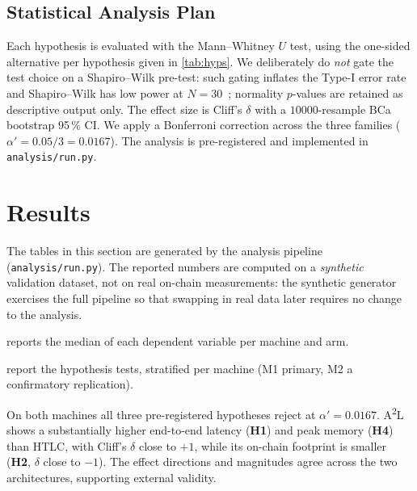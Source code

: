 \documentclass[sigconf,nonacm]{acmart}
\newcommand{\atwol}{A\textsuperscript{2}L\xspace}
\newcommand{\hyplabel}[1]{\textbf{H#1}}
\newcommand{\code}[1]{\texttt{\small #1}}
\begin{document}
\subsection{Statistical Analysis Plan}
Each hypothesis is evaluated with the Mann--Whitney $U$ test, using the
one-sided alternative per hypothesis given in \cref{tab:hyps}. We
deliberately do \emph{not} gate the test choice on a Shapiro--Wilk
pre-test: such gating inflates the Type-I error rate and Shapiro--Wilk has
low power at $N=30$~\citep{rochon2012gatekeeping}; normality $p$-values are
retained as descriptive output only. The effect size is Cliff's $\delta$
with a $\num{10000}$-resample BCa bootstrap 95\,\% CI. We apply a
Bonferroni correction across the three families
($\alpha' = 0.05/3 = 0.0167$). The analysis is pre-registered and
implemented in \code{analysis/run.py}.

\section{Results}
\label{sec:results}

The tables in this section are generated by the analysis pipeline
(\code{analysis/run.py}). The reported numbers are computed on a
\emph{synthetic} validation dataset, not on real on-chain measurements:
the synthetic generator exercises the full pipeline so that swapping in
real data later requires no change to the analysis.

 reports the median of each dependent variable per
machine and arm.



 report the hypothesis tests, stratified per
machine (M1 primary, M2 a confirmatory replication).




On both machines all three pre-registered hypotheses reject at
$\alpha' = 0.0167$. \atwol shows a substantially higher end-to-end latency
(\hyplabel{1}) and peak memory (\hyplabel{4}) than HTLC, with Cliff's
$\delta$ close to $+1$, while its on-chain footprint is smaller
(\hyplabel{2}, $\delta$ close to $-1$). The effect directions and
magnitudes agree across the two architectures, supporting external
validity.

\end{document}
